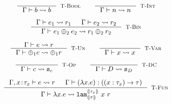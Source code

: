 \newcommand\emptyaxioms{\ensuremath{\emptyset}\xspace}
\newcommand\andaxioms[2]{\ensuremath{{#1}\cup {#2}}\xspace}

\begin{figure}
\hfill{}
$$
\inference{
}{
	\tologicshort{\env}{b}{\tbool}{b}{\tbool}{\emptyset}{\emptyaxioms}
}[\lgbool]
\qquad
\inference{
}{
	\tologicshort{\env}{n}{\tint}{n}{\tint}{\emptyset}{\emptyaxioms}
}[\lgint]
$$

$$
\inference{
    \tologicshort{\env}{e_1}{\typ}{\pred_1}{\embed{\typ}}{\smtenv}{\axioms_1} &
    \tologicshort{\env}{e_2}{\typ}{\pred_2}{\embed{\typ}}{\smtenv}{\axioms_2}
}{
	\tologicshort{\env}{e_1\binop e_2}{\tbool}{\pred_1 \binop\pred_2}{\tbool}{\smtenv}{\andaxioms{\axioms_1}{\axioms_2}}
}[\lgbinGEN]
$$

$$
\inference{
	\tologicshort{\env}{e}{\tbool}{\pred}{\tbool}{\smtenv}{\axioms}
}{
	\tologicshort{\env}{\unop e}{\tbool}{\unop\pred}{\tbool}{\smtenv}{\axioms}
}[\lgun]
\qquad
\inference{
}{
	\tologicshort{\env}{x}{\env(x)}{x}{\embed{\env(x)}}{\emptyset}{\emptyaxioms}
}[\lgvar]
$$

$$
\inference{
}{
	\tologicshort{\env}{c}{\constty{\odot}}{\smtvar{c}}{\embed{\constty{\odot}}}{\emptyset}{\emptyaxioms}
}[\lgpop]
\qquad
\inference{
}{
	\tologicshort{\env}{\dc}{\constty{\dc}}{\smtvar{\dc}}{\embed{\constty{\dc}}}{\emptyset}{\emptyaxioms}
}[\lgdc]
$$



$$
\inference{
    \tologicshort{\env, \tbind{x}{\typ_x}}{e}{}{\pred}{}{}{} &
  	\hastype{\env}{(\efun{x}{}{e})}{(\tfun{x}{\typ_x}{\typ})}\\
}{
	\tologicshort{\env}{\efun{x}{}{e}}{(\tfun{x}{\typ_x}{\typ})}
	        {\smtlamname{\embed{\typ_x}}{\embed{\typ}}\ {x}\ {\pred}}
	        {\sort'}{\smtenv, \tbind{f}{\sort'}}{\andaxioms{\{\axioms_{f_1}, \axioms_{f_2}\}}{\axioms}}
}[\lgfun]
$$


\end{figure}
